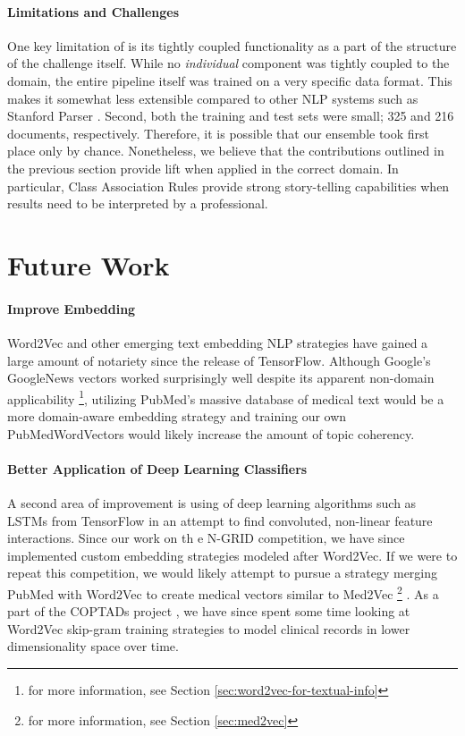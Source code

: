 
\paragraph{Limitations and Challenges} One key limitation of \CREATE is its tightly coupled functionality as a part of the structure of the challenge itself. While no \textit{individual} component was tightly coupled to the domain, the entire pipeline itself was trained on a very specific data format. This makes it somewhat less extensible compared to other NLP systems such as Stanford Parser \cite{stanfordparser}. Second, both the training and test sets were small; 325 and 216 documents, respectively. Therefore, it is possible that our ensemble took first place only by chance. Nonetheless, we believe that the contributions outlined in the previous section provide lift when applied in the correct domain. In particular, Class Association Rules provide strong story-telling capabilities when results need to be interpreted by a professional.

\section{Future Work}

\paragraph{Improve Embedding} \textsf{Word2Vec} and other emerging text embedding NLP strategies have gained a large amount of notariety since the release of TensorFlow. Although Google's \textsf{GoogleNews} vectors worked surprisingly well despite its apparent non-domain applicability \footnote{for more information, see Section \ref{sec:word2vec-for-textual-info}}, utilizing PubMed's massive database of medical text would be a more domain-aware embedding strategy and training our own \textsf{PubMedWordVectors} would likely increase the amount of topic coherency. 

\paragraph{Better Application of Deep Learning Classifiers} A second area of improvement is using of deep learning algorithms such as \textsf{LSTMs} from TensorFlow \cite{tensorflow} in an attempt to find convoluted, non-linear feature interactions. Since our work on th e N-GRID competition, we have since implemented custom embedding strategies modeled after Word2Vec. If we were to repeat this competition, we would likely attempt to pursue a strategy merging PubMed with Word2Vec to create medical vectors similar to Med2Vec \footnote{for more information, see Section \ref{sec:med2vec}} \cite{med2vec}. As a part of the COPTADs project \cite{coptads}, we have since spent some time looking at Word2Vec skip-gram training strategies \cite{word2vec} to model clinical records in lower dimensionality space over time.

